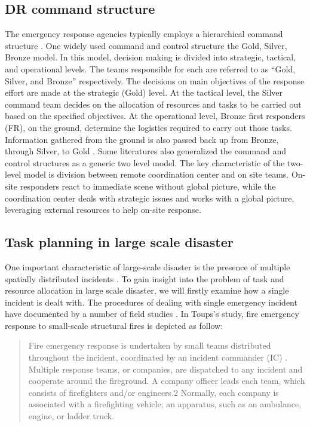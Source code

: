 \subsection{DR command structure}\label{sec:lrstructure}
The emergency response agencies typically employs a hierarchical command structure \cite{Ramchurn2015}. One widely used command and control structure the Gold, Silver, Bronze model. In this model, decision making is divided into strategic, tactical, and operational levels. The teams responsible for each are referred to as ``Gold, Silver, and Bronze'' respectively. The decisions on main objectives of the response effort are made at the strategic (Gold) level. At the tactical level, the Silver command team decides on the allocation of resources and tasks to be carried out  based on the specified objectives. At the operational level, Bronze first responders (FR), on the ground, determine the logistics required to carry out those tasks. Information gathered from the ground is also passed back up from Bronze, through Silver, to Gold \cite{Ramchurn2015}. Some literatures \cite{Chen2005,Chen2008} also generalized the command and control structures as a generic two level model. The key characteristic of the two-level model is division between remote coordination center and on site teams.  On-site responders react to immediate scene without global picture, while the coordination center deals with strategic issues and works with a global picture, leveraging external resources to help on-site response. \\


\subsection{Task planning in large scale disaster} \label{sec:LRtaskplanning}
One important characteristic of large-scale disaster is the presence of multiple spatially distributed incidents \cite{Chen2005}. To gain insight into the problem of task and resource allocation in large scale disaster, we will firstly examine how a single incident is dealt with. The procedures of dealing with single emergency incident have documented by a number of field studies \cite{Comfort2004,Dawes2004,Petrescu-prahova2005}. In Toups's \cite{Toups2011} study, fire emergency response to small-scale structural fires is depicted as follow: 

\begin{quote}
Fire emergency response is undertaken by small teams distributed throughout the incident, coordinated by an incident commander (IC) . Multiple response teams, or companies, are dispatched to any incident and cooperate around the fireground. A company officer leads each team, which consists of firefighters and/or engineers.2 Normally, each company is associated with a firefighting vehicle; an apparatus, such as an ambulance, engine, or ladder truck.\\
\end{quote}

